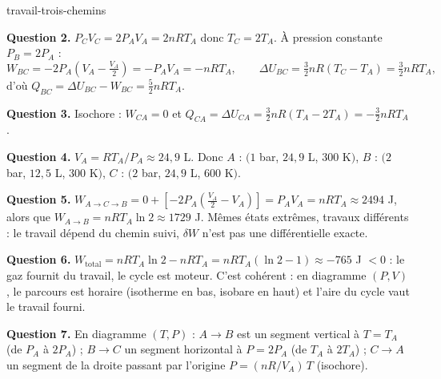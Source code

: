 \begin{exo}{travail-trois-chemins}
\begin{solution}
\textbf{Question 2.} $P_CV_C = 2P_AV_A = 2nRT_A$ donc $T_C = 2T_A$. À pression constante $P_B = 2P_A$ :
\[
W_{BC} = -2P_A\left(V_A - \tfrac{V_A}{2}\right) = -P_AV_A = -nRT_A, \qquad \Delta U_{BC} = \tfrac{3}{2}nR(T_C - T_A) = \tfrac{3}{2}nRT_A,
\]
d'où $Q_{BC} = \Delta U_{BC} - W_{BC} = \tfrac{5}{2}nRT_A$.

\textbf{Question 3.} Isochore : $W_{CA} = 0$ et $Q_{CA} = \Delta U_{CA} = \tfrac{3}{2}nR(T_A - 2T_A) = -\tfrac{3}{2}nRT_A$.

\textbf{Question 4.} $V_A = RT_A/P_A \approx 24{,}9$ L. Donc $A$ : $(1$ bar, $24{,}9$ L, $300$ K$)$, $B$ : $(2$ bar, $12{,}5$ L, $300$ K$)$, $C$ : $(2$ bar, $24{,}9$ L, $600$ K$)$.

\textbf{Question 5.} $W_{A\to C\to B} = 0 + \left[-2P_A\left(\tfrac{V_A}{2} - V_A\right)\right] = P_AV_A = nRT_A \approx 2494$ J, alors que $W_{A\to B} = nRT_A\ln 2 \approx 1729$ J. Mêmes états extrêmes, travaux différents : le travail dépend du chemin suivi, $\delta W$ n'est pas une différentielle exacte.

\textbf{Question 6.} $W_{\text{total}} = nRT_A\ln 2 - nRT_A = nRT_A(\ln 2 - 1) \approx -765$ J $< 0$ : le gaz fournit du travail, le cycle est moteur. C'est cohérent : en diagramme $(P,V)$, le parcours est horaire (isotherme en bas, isobare en haut) et l'aire du cycle vaut le travail fourni.

\textbf{Question 7.} En diagramme $(T,P)$ : $A\to B$ est un segment vertical à $T = T_A$ (de $P_A$ à $2P_A$) ; $B\to C$ un segment horizontal à $P = 2P_A$ (de $T_A$ à $2T_A$) ; $C\to A$ un segment de la droite passant par l'origine $P = (nR/V_A)\,T$ (isochore).
\end{solution}
\end{exo}

